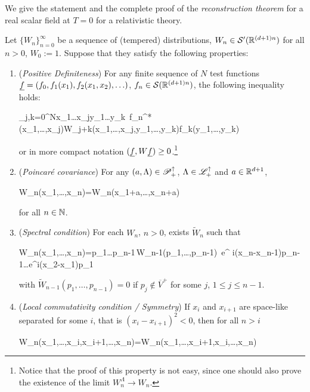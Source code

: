 \documentclass[../main/main.tex]{subfiles}
\begin{document}
We give the statement and the complete proof of the \emph{reconstruction theorem} for a real scalar field at $T=0$ for a relativistic theory.

\begin{theorem}
	Let $\{W_n\}_{n=0}^\infty$ be a sequence of (tempered) distributions, $W_n\in\mathcal S'(\mathbb{R}^{(d+1)n})$ for all $n>0$, $W_0:=1$. Suppose that they satisfy the following properties:
	\begin{enumerate}[label=(\arabic*)]
		\item (\emph{Positive Definiteness}) For any finite sequence of $N$ test functions $\uf=(f_0,f_1(x_1),f_2(x_1,x_2),\ldots)$, $f_n\in\mathcal S(\mathbb{R}^{(d+1)n})$, the following inequality holds:
		\begin{eq}
			\sum_{j,k=0}^N\int\de x_1\ldots\de x_j\de y_1\ldots\de y_k \,f_n^*(x_1,\ldots,x_j)W_{j+k}(x_1,\ldots,x_j,y_1,\ldots,y_k)f_k(y_1,\ldots,y_k)
		\end{eq}
		or in more compact notation $(\uf,W\uf)\geq0$.\footnote{Notice that the proof of this property is not easy, since one should also prove the existence of the limit $W_n^\Lambda\to W_n$.} 
		\item (\emph{Poincaré covariance}) For any $(a,\Lambda)\in\mathscr P_+^\uparrow$, $\Lambda\in\mathscr L_+^\uparrow$ and $a\in\mathbb{R}^{d+1}$, 
		\begin{eq}
			W_n(x_1,\ldots,x_n)=W_n(\Lambda x_1+a,\ldots,\Lambda x_n+a)
		\end{eq}
		for all $n\in\mathbb{N}$.
		\item (\emph{Spectral condition}) For each $W_n$, $n>0$, exists $\widetilde W_n$ such that
		\begin{eq}\label{eq:reconstr_thm_hp_3}
			W_n(x_1,\ldots,x_n)=\int\de p_1\ldots\de p_{n-1}\,\widetilde W_{n-1}(p_1,\ldots,p_{n-1})\, e^{ i(x_n-x_{n-1})p_{n-1}}\ldots e^{i(x_2-x_1)p_1}
		\end{eq}
		with $\widetilde W_{n-1}(p_1,\ldots,p_{n-1})=0$ if $p_j\not\in \overline V^+$ for some $j$, $1\leq j\leq n-1$. 
		\item (\emph{Local commutativity condition / Symmetry}) If $x_i$ and $x_{i+1}$ are space-like separated for some $i$, that is $(x_i-x_{i+1})^2<0$, then for all $n>i$
		\begin{eq}
			W_n(x_1,\ldots,x_i,x_{i+1},\ldots,x_n)=W_n(x_1,\ldots,x_{i+1},x_i,\ldots,x_n)
		\end{eq}

\end{enumerate}
\end{theorem}
\end{document}

